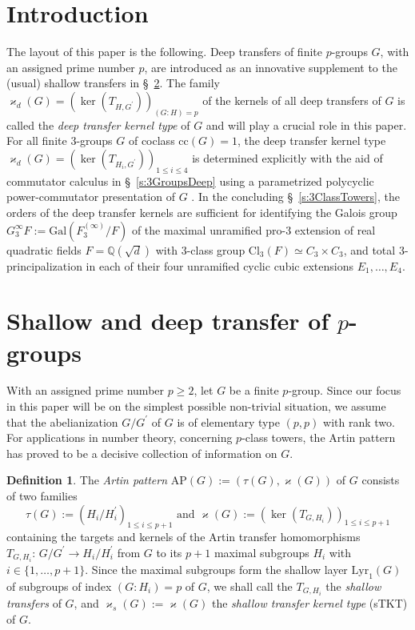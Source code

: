 \documentclass{amsart}
\theoremstyle{definition}
\newtheorem{definition}{Definition}[section]
\numberwithin{equation}{section}
\begin{document}
\section{Introduction}
\label{s:Intro}
\noindent
The layout of this paper is the following.
Deep transfers of finite \(p\)-groups \(G\), with an assigned prime number \(p\),
are introduced as an innovative supplement to the (usual) shallow transfers
\cite{Ma2}
in \S\
\ref{s:ShallowDeep}.
The family \(\varkappa_d(G)=(\ker(T_{H,G^\prime}))_{(G:H)=p}\)
of the kernels of all deep transfers of \(G\)
is called the \textit{deep transfer kernel type} of \(G\)
and will play a crucial role in this paper.
For all finite \(3\)-groups \(G\) of coclass \(\mathrm{cc}(G)=1\),
the deep transfer kernel type \(\varkappa_d(G)=(\ker(T_{H_i,G^\prime}))_{1\le i\le 4}\)
is determined explicitly with the aid of commutator calculus in \S\
\ref{s:3GroupsDeep}
using a parametrized polycyclic power-commutator presentation of \(G\)
\cite{Bl2,Mi,Ne}.
In the concluding \S\
\ref{s:3ClassTowers},
the orders of the deep transfer kernels are sufficient for
identifying the Galois group \(G_3^\infty{F}:=\mathrm{Gal}(F_3^{(\infty)}/F)\)
of the maximal unramified pro-\(3\) extension
of real quadratic fields \(F=\mathbb{Q}(\sqrt{d})\)
with \(3\)-class group \(\mathrm{Cl}_3(F)\simeq C_3\times C_3\),
and total \(3\)-principalization in each of their four unramified cyclic cubic extensions \(E_1,\ldots,E_4\).



\section{Shallow and deep transfer of \(p\)-groups}
\label{s:ShallowDeep}
\noindent
With an assigned prime number \(p\ge 2\),
let \(G\) be a finite \(p\)-group.
Since our focus in this paper will be on the simplest possible non-trivial situation,
we assume that the abelianization \(G/G^\prime\) of \(G\) is of elementary type \((p,p)\) with rank two.
For applications in number theory, concerning \(p\)-class towers,
the Artin pattern has proved to be a decisive collection of information on \(G\).

\begin{definition}
\label{dfn:Shallow}
The \textit{Artin pattern} \(\mathrm{AP}(G):=(\tau(G),\varkappa(G))\) of \(G\) consists of two families
\begin{equation}
\label{eqn:ArtinPattern}
\tau(G):=(H_i/H_i^\prime)_{1\le i\le p+1} \text{ and } \varkappa(G):=(\ker(T_{G,H_i}))_{1\le i\le p+1}
\end{equation}
containing the targets and kernels
of the Artin transfer homomorphisms \(T_{G,H_i}:\,G/G^\prime\to H_i/H_i^\prime\)
\cite{Ma9}
from \(G\) to its \(p+1\) maximal subgroups \(H_i\) with \(i\in\lbrace 1,\ldots,p+1\rbrace\).
Since the maximal subgroups form the shallow layer \(\mathrm{Lyr}_1(G)\)
of subgroups of index \((G:H_i)=p\) of \(G\),
we shall call the \(T_{G,H_i}\) the \textit{shallow transfers} of \(G\),
and \(\varkappa_s(G):=\varkappa(G)\) the \textit{shallow transfer kernel type} (sTKT) of \(G\).
\end{definition}
\end{document}
